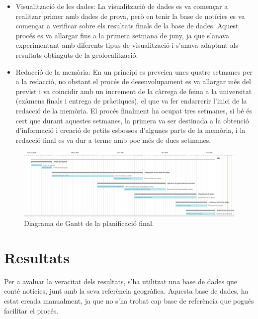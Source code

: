 \documentclass[12pt,a4paper,openright,oneside]{article}
\numberwithin{equation}{section}
\theoremstyle{definition}
\begin{document}
\begin{itemize}
\item Visualització de les dades: La visualització de dades es va començar a realitzar primer amb dades de prova, però en tenir la base de notícies es va començar a verificar sobre els resultats finals de la base de dades. Aquest procés es va allargar fins a la primera setmana de juny, ja que s'anava experimentant amb diferents tipus de visualització i s'anava adaptant als resultats obtinguts de la geolocalització.
\item Redacció de la memòria: En un principi es preveien unes quatre setmanes per a la redacció, no obstant el procés de desenvolupament es va allargar més del previst i va coincidir amb un increment de la càrrega de feina a la universitat (exàmens finals i entrega de pràctiques), el que va fer endarrerir l'inici de la redacció de la memòria. El procés finalment ha ocupat tres setmanes, si bé és cert que durant aquestes setmanes, la primera va ser destinada a la obtenció d'informació i creació de petits esbossos d'algunes parts de la memòria, i la redacció final es va dur a terme amb poc més de dues setmanes.
\end{itemize}

\begin{figure}[!htbp]
\centering
\includegraphics[width=16cm]{pla-final.png}
\caption{Diagrama de Gantt de la planificació final.}
\end{figure}

\newpage
\section{Resultats}
Per a avaluar la veracitat dels resultats, s'ha utilitzat una base de dades que conté notícies, junt amb la seva referència geogràfica. Aquesta base de dades, ha estat creada manualment, ja que no s'ha trobat cap base de referència que pogués facilitar el procés.\\
\end{document}
